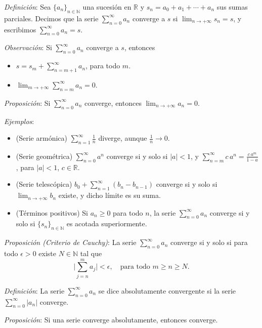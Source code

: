 \documentclass{beamer}
\begin{document}
  \begin{frame}
    \textit{Definición}: Sea $\{a_n\}_{n \in \mathbb{N}}$ una sucesión en
    $\mathbb{R}$ y $s_n = a_0 + a_1 + \cdots + a_n$ sus sumas parciales.
    Decimos que la serie $\sum_{n=0}^{\infty} a_n$ converge a $s$ si
    $\lim_{n \to +\infty} s_n = s$, y escribimos $\sum_{n=0}^{\infty} a_n = s$.
    \newline\newline
    \pause

    \textit{Observación}: Si $\sum_{n=0}^{\infty} a_n$ converge a $s$, entonces
    \begin{itemize}[<+->]
      \item $s = s_m + \sum_{n=m+1}^{\infty} a_n$, para todo $m$.
      \item $\lim_{m \to +\infty} \sum_{n=m}^{\infty} a_n = 0$.
    \end{itemize}
    \vspace{0.3cm}
    \pause

    \textit{Proposición}: Si $\sum_{n=0}^{\infty} a_n$ converge, entonces
    $\lim_{n \to +\infty} a_n = 0$.
  \end{frame}

  \begin{frame}
    \textit{Ejemplos}:
    \begin{itemize}[<+->]
      \item (Serie armónica) $\sum_{n=1}^{\infty} \frac{1}{n}$ diverge,
        aunque $\frac{1}{n} \to 0$.
      \item (Serie geométrica) $\sum_{n=0}^{\infty} a^n$ converge si y solo si
        $|a| < 1$, y
        $\sum_{n=m}^{\infty} c\,a^n = \frac{c\,a^m}{1-a}$, para $|a|<1$, $c \in \mathbb{R}$.
      \item (Serie telescópica) $b_0 + \sum_{n=1}^{\infty} (b_n - b_{n-1})$
        converge si y solo si $\lim_{n \to +\infty} b_n$ existe, y dicho límite
        es su suma.
      \item (Términos positivos) Si $a_n \geq 0$ para todo $n$, la serie
        $\sum_{n=0}^{\infty} a_n$ converge si y solo si $\{s_n\}_{n \in \mathbb{N}}$
        es acotada superiormente.
    \end{itemize}
  \end{frame}

  \begin{frame}
    \textit{Proposición (Criterio de Cauchy)}: La serie $\sum_{n=0}^{\infty} a_n$
    converge si y solo si para todo $\epsilon > 0$ existe $N \in \mathbb{N}$ tal que
    \[
      \Big| \sum_{j=n}^{m} a_j \Big| < \epsilon, \quad \text{para todo } m \geq n \geq N.
    \]
    \pause

    \textit{Definición}: La serie $\sum_{n=0}^{\infty} a_n$ se dice absolutamente
    convergente si la serie $\sum_{n=0}^{\infty} |a_n|$ converge.
    \newline\newline
    \pause

    \textit{Proposición}: Si una serie converge absolutamente, entonces converge.
  \end{frame}
\end{document}
